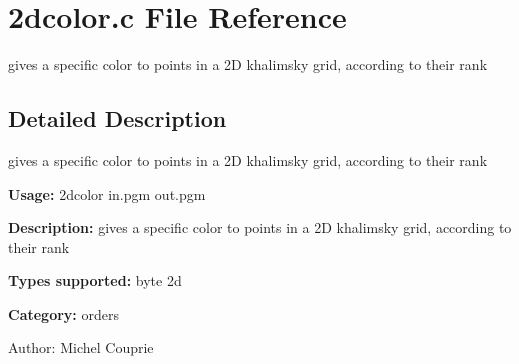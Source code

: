 \section{2dcolor.c File Reference}
\label{2dcolor_8c}
gives a specific color to points in a 2D khalimsky grid, according to their rank  




\label{_details}
\subsection{Detailed Description}
gives a specific color to points in a 2D khalimsky grid, according to their rank 

{\bf Usage:} 2dcolor in.pgm out.pgm

{\bf Description:} gives a specific color to points in a 2D khalimsky grid, according to their rank

{\bf Types supported:} byte 2d

{\bf Category:} orders

\begin{Desc}
\item[Author:]Michel Couprie \end{Desc}
